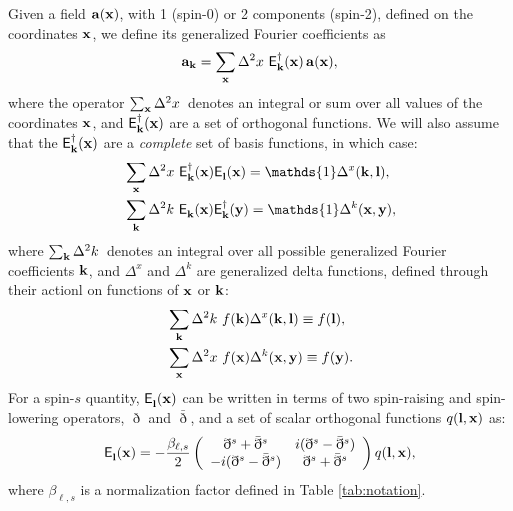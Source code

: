 \documentclass[a4paper,11pt]{article}
\newcommand{\summ}[1]{\sum_{\bf #1}\Delta^2 #1\,}
\newcommand{\Ylm}[3]{{\sf E}^{#1}_{\bf #2}({\bf #3})}
\begin{document}
      Given a field ${\bf a}({\bf x})$, with 1 (spin-0) or 2 components (spin-2), defined on the coordinates ${\bf x}$, we define its generalized Fourier coefficients as
      \begin{equation}
        {\bf a}_{\bf k}=\summ{x}\,\Ylm{\dag}{k}{x}\,{\bf a}({\bf x}),
      \end{equation}
      where the operator $\summ{x}$ denotes an integral or sum over all values of the coordinates ${\bf x}$, and $\Ylm{\dag}{k}{x}$ are a set of orthogonal functions. We will also assume that the $\Ylm{\dag}{k}{x}$ are a \emph{complete} set of basis functions, in which case:
      \begin{align}
        &\summ{x}\,\Ylm{\dag}{k}{x}\Ylm{}{l}{x}=\mathds{1}\Delta^x({\bf k},{\bf l}),\\
        &\summ{k}\,\Ylm{}{k}{x}\Ylm{\dag}{k}{y}=\mathds{1}\Delta^k({\bf x},{\bf y}),
      \end{align}
      where $\summ{k}$ denotes an integral over all possible generalized Fourier coefficients ${\bf k}$, and $\Delta^x$ and $\Delta^k$ are generalized delta functions, defined through their actionl on functions of ${\bf x}$ or ${\bf k}$:
      \begin{align}
        &\summ{k}\,f({\bf k})\Delta^x({\bf k},{\bf l})\equiv f({\bf l}),\\
        &\summ{x}\,f({\bf x})\Delta^k({\bf x},{\bf y})\equiv f({\bf y}).
      \end{align}
      For a spin-$s$ quantity, $\Ylm{}{l}{x}$ can be written in terms of two spin-raising and spin-lowering operators, $\eth$ and $\bar{\eth}$, and a set of scalar orthogonal functions $q({\bf l},{\bf x})$ as:
      \begin{equation}
        \Ylm{}{l}{x}=-\frac{\beta_{\ell,s}}{2}\left(
        \begin{array}{cc}
          \eth^s+\bar{\eth}^s & i(\eth^s-\bar{\eth}^s)\\
          -i(\eth^s-\bar{\eth}^s) & \eth^s+\bar{\eth}^s
        \end{array}\right) q({\bf l},{\bf x}),
      \end{equation}
      where $\beta_{\ell,s}$ is a normalization factor defined in Table \ref{tab:notation}.
    
\end{document}
